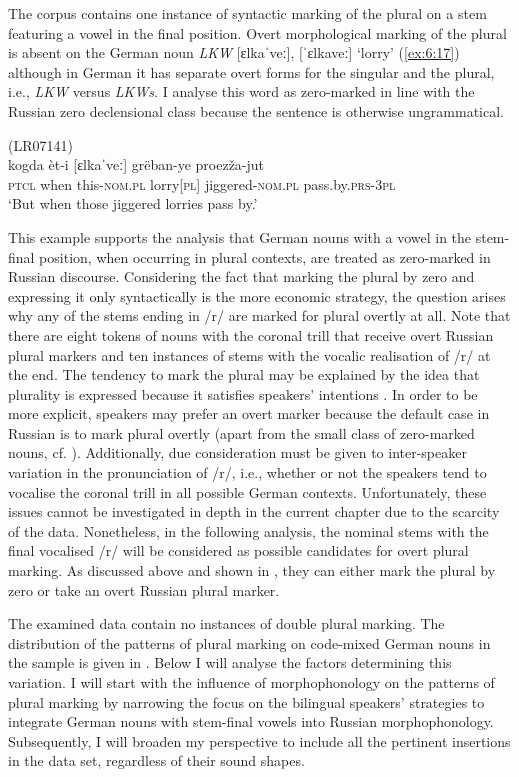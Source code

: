 The corpus contains one instance of syntactic marking of the plural on a stem featuring a vowel in the final position. Overt morphological marking of the plural is absent on the German noun \textit{LKW} [ɛlkaˈveː], [ˈɛlkaveː] `lorry' (\ref{ex:6:17}) although in German it has separate overt forms for the singular and the plural, i.e., \textit{LKW} versus \textit{LKWs}. I analyse this word as zero-marked in line with the Russian zero declensional class because the sentence is otherwise ungrammatical.

\ea
\label{ex:6:17}
(LR07141)\\
 {kogda} {èt-i} [ɛlkaˈveː] {grëban-ye} {proezža-jut}\\
	\textsc{ptcl} when this-\textsc{nom.pl} lorry[\textsc{pl}] jiggered-\textsc{nom.pl} pass.by.\textsc{prs-3pl}\\
\glt `But when those jiggered lorries pass by.'
\z

\noindent This example supports the analysis that German nouns with a vowel in the stem-final position, when occurring in plural contexts, are treated as zero-marked in Russian discourse. Considering the fact that marking the plural by zero and expressing it only syntactically is the more economic strategy, the question arises why any of the stems ending in /r/ are marked for plural overtly at all. Note that there are eight tokens of nouns with the coronal trill that receive overt Russian plural markers and ten instances of stems with the vocalic realisation of /r/ at the end. The tendency to mark the plural may be explained by the idea that plurality is expressed because it satisfies speakers' intentions \citep[150]{myers-scotton-contact-2002}. In order to be more explicit, speakers may prefer an overt marker because the default case in Russian is to mark plural overtly (apart from the small class of zero-marked nouns, cf. \citealt[218]{zaliznjak02}). Additionally, due consideration must be given to inter-speaker variation in the pronunciation of /r/, i.e., whether or not the speakers tend to vocalise the coronal trill in all possible German contexts. Unfortunately, these issues cannot be investigated in depth in the current chapter due to the scarcity of the data. Nonetheless, in the following analysis, the nominal stems with the final vocalised /r/ will be considered as possible candidates for overt plural marking. As discussed above and shown in , they can either mark the plural by zero or take an overt Russian plural marker.

The examined data contain no instances of double plural marking. The distribution of the patterns of plural marking on code-mixed German nouns in the sample is given in . Below I will analyse the factors determining this variation. I will start with the influence of morphophonology on the patterns of plural marking by narrowing the focus on the bilingual speakers’ strategies to integrate German nouns with stem-final vowels into Russian morphophonology. Subsequently, I will broaden my perspective to include all the pertinent insertions in the data set, regardless of their sound shapes.


